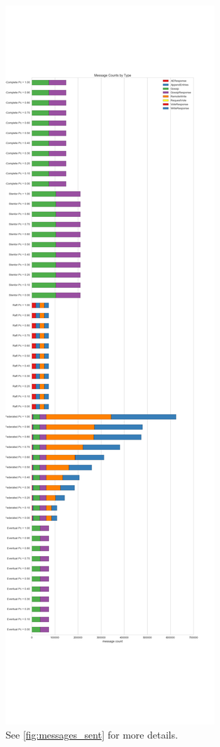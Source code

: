 \documentclass[11pt,letterpaper]{article}
\begin{document}
\begin{figure}[!h]
    \centering
        \includegraphics[height=.9\textheight]{figures/message_counts.png}
        \caption{\textsf{See \ref{fig:messages_sent} for more details.}}
        \label{fig:message_counts}
\end{figure}
\end{document}
